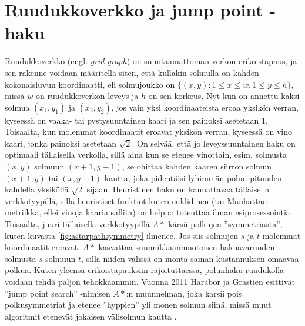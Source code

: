 \documentclass[finnish]{tktltiki2}
\theoremstyle{definition}
\theoremstyle{remark}
\begin{document}
\section{Ruudukkoverkko ja jump point -haku}
\label{sec:gridgraph}
Ruudukkoverkko (engl. \textit{grid graph}) on suuntaamattoman verkon erikoistapaus, ja sen rakenne voidaan määritellä siten, että kullakin solmulla on kahden kokonaisluvun koordinaatti, eli solmujoukko on $\{ (x, y) \colon 1 \leq x \leq w, 1 \leq y \leq h \}$, missä $w$ on ruudukkoverkon leveys ja $h$ on sen korkeus. Nyt kun on annettu kaksi solmua $(x_1, y_1)$ ja $(x_2, y_2)$, jos vain yksi koordinaateista eroaa yksikön verran, kyseessä on vaaka- tai pystysuuntainen kaari ja sen painoksi asetetaan 1. Toisaalta, kun molemmat koordinaatit eroavat yksikön verran, kyseessä on vino kaari, jonka painoksi asetetaan $\sqrt{2}$. On selvää, että jo leveyssuuntainen haku on optimaali tällaisella verkolla, sillä aina kun se etenee vinottain, esim. solmusta $(x, y)$ solmuun $(x + 1, y - 1)$, se ohittaa kahden kaaren siirron solmun $(x + 1, y)$ tai $(x, y - 1)$ kautta, joka pidentäisi lyhimmän polun pituuden kahdella yksiköllä $\sqrt{2}$ sijaan. Heuristinen haku on kannattavaa tällaisella verkkotyypillä, sillä heuristiset funktiot kuten euklidinen (tai Manhattan-metriikka, ellei vinoja kaaria sallita) on helppo toteuttaa ilman esiprosessointia. Toisaalta, juuri tällaisella verkkotyypillä $A\ast$ kärsii polkujen ''symmetriasta'', kuten kuvasta \ref{fig:astarpathsymmetry} ilmenee. Jos siis solmujen $s$ ja $t$ molemmat koordinaatit eroavat, $A\ast$ kasvattaa suunnikkaanmuotoisen hakuavaruuden solmusta $s$ solmuun $t$, sillä niiden välissä on monta saman kustannuksen omaavaa polkua. Kuten yleensä erikoistapauksiin  rajoituttaessa, polunhaku ruudukolla voidaan tehdä paljon tehokkaammin. Vuonna 2011 Harabor ja Grastien esittivät ''jump point search'' -nimisen $A\ast$:n muunnelman, joka karsii pois polkusymmetriat ja etenee ''hyppien'' yli monen solmun siinä, missä muut algoritmit etenevät jokaisen välisolmun kautta \cite{Harabor11}.
\end{document}
